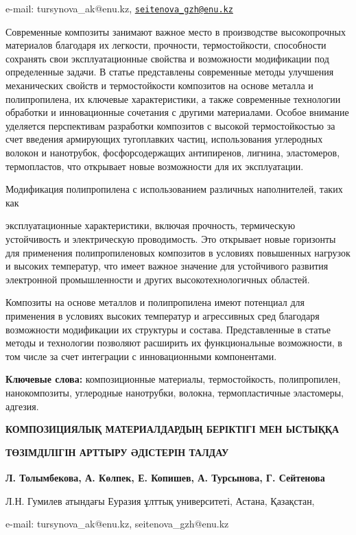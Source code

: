 e-mail: tursynova\_ak@enu.kz,
\href{mailto:seitenova_gzh@enu.kz}{\nolinkurl{seitenova\_gzh@enu.kz}}

Современные композиты занимают важное место в производстве высокопрочных
материалов благодаря их легкости, прочности, термостойкости, способности
сохранять свои эксплуатационные свойства и возможности модификации под
определенные задачи. В статье представлены современные методы улучшения
механических свойств и термостойкости композитов на основе металла и
полипропилена, их ключевые характеристики, а также современные
технологии обработки и инновационные сочетания с другими материалами.
Особое внимание уделяется перспективам разработки композитов с высокой
термостойкостью за счет введения армирующих тугоплавких частиц,
использования углеродных волокон и нанотрубок, фосфорсодержащих
антипиренов, лигнина, эластомеров, термопластов, что открывает новые
возможности для их эксплуатации.

Модификация полипропилена с использованием различных наполнителей, таких
как

эксплуатационные характеристики, включая прочность, термическую
устойчивость и электрическую проводимость. Это открывает новые горизонты
для применения полипропиленовых композитов в условиях повышенных
нагрузок и высоких температур, что имеет важное значение для устойчивого
развития электронной промышленности и других высокотехнологичных
областей.

Композиты на основе металлов и полипропилена имеют потенциал для
применения в условиях высоких температур и агрессивных сред благодаря
возможности модификации их структуры и состава. Представленные в статье
методы и технологии позволяют расширить их функциональные возможности, в
том числе за счет интеграции с инновационными компонентами.

{\bfseries Ключевые слова:} композиционные материалы, термостойкость,
полипропилен, нанокомпозиты, углеродные нанотрубки, волокна,
термопластичные эластомеры, адгезия.

{\bfseries КОМПОЗИЦИЯЛЫҚ МАТЕРИАЛДАРДЫҢ БЕРІКТІГІ МЕН ЫСТЫҚҚА}

{\bfseries ТӨЗІМДІЛІГІН АРТТЫРУ ӘДІСТЕРІН ТАЛДАУ}

{\bfseries Л. Толымбекова, А. Көлпек, Е. Копишев, А.
Турсынова\textsuperscript{\envelope }, Г. Сейтенова\textsuperscript{\envelope }}

Л.Н. Гумилев атындағы Еуразия ұлттық университеті, Астана, Қазақстан,

e-mail: tursynova\_ak@enu.kz, seitenova\_gzh@enu.kz

